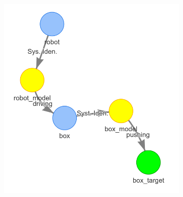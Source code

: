 \begin{figure}[H]
\begin{subfigure}{.3\textwidth}
    \centering
    \includegraphics[width=1\textwidth]{figures/connecting_nodes/robot_push/robot_push_3}
    \caption{}\label{subfig:robot_push_3}
    \end{subfigure}


\end{figure}
